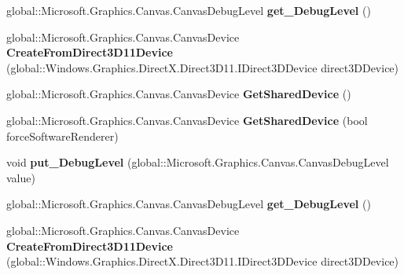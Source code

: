 \begin{DoxyCompactItemize}
global\+::\+Microsoft.\+Graphics.\+Canvas.\+Canvas\+Debug\+Level {\bfseries get\+\_\+\+Debug\+Level} ()
\item 
\mbox{\label{interface_microsoft_1_1_graphics_1_1_canvas_1_1_i_canvas_device_statics_aa4908871d26502b4e2767051688362b6}} 
global\+::\+Microsoft.\+Graphics.\+Canvas.\+Canvas\+Device {\bfseries Create\+From\+Direct3\+D11\+Device} (global\+::\+Windows.\+Graphics.\+Direct\+X.\+Direct3\+D11.\+I\+Direct3\+D\+Device direct3\+D\+Device)
\item 
\mbox{\label{interface_microsoft_1_1_graphics_1_1_canvas_1_1_i_canvas_device_statics_a980677dde098e69b5c096e2e2533711e}} 
global\+::\+Microsoft.\+Graphics.\+Canvas.\+Canvas\+Device {\bfseries Get\+Shared\+Device} ()
\item 
\mbox{\label{interface_microsoft_1_1_graphics_1_1_canvas_1_1_i_canvas_device_statics_a80dff67885dd4f6bc9a02d62a3ed0e5b}} 
global\+::\+Microsoft.\+Graphics.\+Canvas.\+Canvas\+Device {\bfseries Get\+Shared\+Device} (bool force\+Software\+Renderer)
\item 
\mbox{\label{interface_microsoft_1_1_graphics_1_1_canvas_1_1_i_canvas_device_statics_ad0fd3fa78db03abbc15b048622448383}} 
void {\bfseries put\+\_\+\+Debug\+Level} (global\+::\+Microsoft.\+Graphics.\+Canvas.\+Canvas\+Debug\+Level value)
\item 
\mbox{\label{interface_microsoft_1_1_graphics_1_1_canvas_1_1_i_canvas_device_statics_a87a1ee33571fda0a663fd8a722d12f18}} 
global\+::\+Microsoft.\+Graphics.\+Canvas.\+Canvas\+Debug\+Level {\bfseries get\+\_\+\+Debug\+Level} ()
\item 
\mbox{\label{interface_microsoft_1_1_graphics_1_1_canvas_1_1_i_canvas_device_statics_aa4908871d26502b4e2767051688362b6}} 
global\+::\+Microsoft.\+Graphics.\+Canvas.\+Canvas\+Device {\bfseries Create\+From\+Direct3\+D11\+Device} (global\+::\+Windows.\+Graphics.\+Direct\+X.\+Direct3\+D11.\+I\+Direct3\+D\+Device direct3\+D\+Device)

\end{DoxyCompactItemize}
